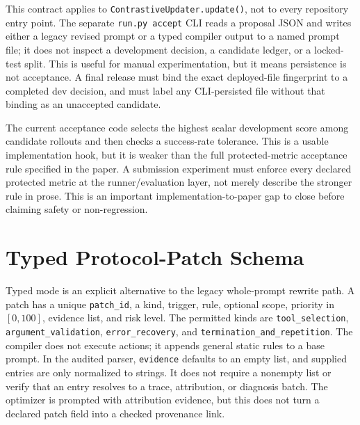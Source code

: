\documentclass[10pt]{article}
\begin{document}
This contract applies to \texttt{ContrastiveUpdater.update()}, not to every repository entry point. The separate \texttt{run.py accept} CLI reads a proposal JSON and writes either a legacy revised prompt or a typed compiler output to a named prompt file; it does not inspect a development decision, a candidate ledger, or a locked-test split. This is useful for manual experimentation, but it means persistence is not acceptance. A final release must bind the exact deployed-file fingerprint to a completed dev decision, and must label any CLI-persisted file without that binding as an unaccepted candidate.

The current acceptance code selects the highest scalar development score among candidate rollouts and then checks a success-rate tolerance. This is a usable implementation hook, but it is weaker than the full protected-metric acceptance rule specified in the paper. A submission experiment must enforce every declared protected metric at the runner/evaluation layer, not merely describe the stronger rule in prose. This is an important implementation-to-paper gap to close before claiming safety or non-regression.

\section{Typed Protocol-Patch Schema}
Typed mode is an explicit alternative to the legacy whole-prompt rewrite path. A patch has a unique \texttt{patch\_id}, a kind, trigger, rule, optional scope, priority in $[0,100]$, evidence list, and risk level. The permitted kinds are \texttt{tool\_selection}, \texttt{argument\_validation}, \texttt{error\_recovery}, and \texttt{termination\_and\_repetition}. The compiler does not execute actions; it appends general static rules to a base prompt. In the audited parser, \texttt{evidence} defaults to an empty list, and supplied entries are only normalized to strings. It does not require a nonempty list or verify that an entry resolves to a trace, attribution, or diagnosis batch. The optimizer is prompted with attribution evidence, but this does not turn a declared patch field into a checked provenance link.
\end{document}
